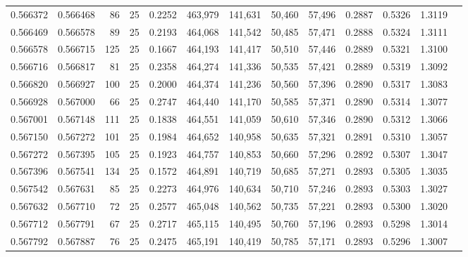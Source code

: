 \begin{tabular}{rrrrrrrrrrrrr}
0.566372 & 0.566468 &    86 &  25 &                                     0.2252 & 463,979 & 141,631 &  50,460 &  57,496 & 0.2887 & 0.5326 & 1.3119 \\
0.566469 & 0.566578 &    89 &  25 &                                     0.2193 & 464,068 & 141,542 &  50,485 &  57,471 & 0.2888 & 0.5324 & 1.3111 \\
0.566578 & 0.566715 &   125 &  25 &                                     0.1667 & 464,193 & 141,417 &  50,510 &  57,446 & 0.2889 & 0.5321 & 1.3100 \\
0.566716 & 0.566817 &    81 &  25 &                                     0.2358 & 464,274 & 141,336 &  50,535 &  57,421 & 0.2889 & 0.5319 & 1.3092 \\
0.566820 & 0.566927 &   100 &  25 &                                     0.2000 & 464,374 & 141,236 &  50,560 &  57,396 & 0.2890 & 0.5317 & 1.3083 \\
0.566928 & 0.567000 &    66 &  25 &                                     0.2747 & 464,440 & 141,170 &  50,585 &  57,371 & 0.2890 & 0.5314 & 1.3077 \\
0.567001 & 0.567148 &   111 &  25 &                                     0.1838 & 464,551 & 141,059 &  50,610 &  57,346 & 0.2890 & 0.5312 & 1.3066 \\
0.567150 & 0.567272 &   101 &  25 &                                     0.1984 & 464,652 & 140,958 &  50,635 &  57,321 & 0.2891 & 0.5310 & 1.3057 \\
0.567272 & 0.567395 &   105 &  25 &                                     0.1923 & 464,757 & 140,853 &  50,660 &  57,296 & 0.2892 & 0.5307 & 1.3047 \\
0.567396 & 0.567541 &   134 &  25 &                                     0.1572 & 464,891 & 140,719 &  50,685 &  57,271 & 0.2893 & 0.5305 & 1.3035 \\
0.567542 & 0.567631 &    85 &  25 &                                     0.2273 & 464,976 & 140,634 &  50,710 &  57,246 & 0.2893 & 0.5303 & 1.3027 \\
0.567632 & 0.567710 &    72 &  25 &                                     0.2577 & 465,048 & 140,562 &  50,735 &  57,221 & 0.2893 & 0.5300 & 1.3020 \\
0.567712 & 0.567791 &    67 &  25 &                                     0.2717 & 465,115 & 140,495 &  50,760 &  57,196 & 0.2893 & 0.5298 & 1.3014 \\
0.567792 & 0.567887 &    76 &  25 &                                     0.2475 & 465,191 & 140,419 &  50,785 &  57,171 & 0.2893 & 0.5296 & 1.3007 \\

\end{tabular}
